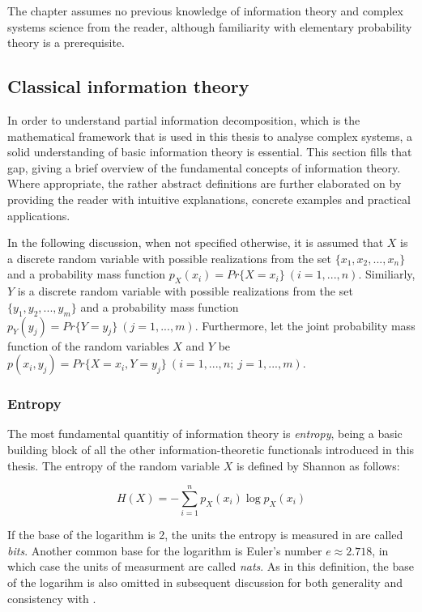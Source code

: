 \documentclass[12pt]{article}
\begin{document}
The chapter assumes no previous knowledge of information theory and complex systems science from the reader, although familiarity with elementary probability theory is a prerequisite. 

\subsection{Classical information theory}

In order to understand partial information decomposition, which is the mathematical framework that is used in this thesis to analyse complex systems, a solid understanding of basic information theory is essential. This section fills that gap, giving a brief overview of the fundamental concepts of information theory. Where appropriate, the rather abstract definitions are further elaborated on by providing the reader with intuitive explanations, concrete examples and practical applications. 

In the following discussion, when not specified otherwise, it is assumed that $X$ is a discrete random variable with possible realizations from the set $\{x_1, x_2, ..., x_n\}$ and a probability mass function $p_X(x_i) = Pr\{X = x_i\} \ (i = 1, ..., n)$. Similiarly, $Y$ is a discrete random variable with possible realizations from the set $\{y_1, y_2, ..., y_m\}$ and a probability mass function $p_Y(y_j) = Pr\{Y = y_j\} \ (j = 1, ..., m)$. Furthermore, let the joint probability mass function of the random variables $X$ and $Y$ be $p(x_i, y_j) = Pr\{X = x_i, Y = y_j\} \ (i = 1, ..., n; \ j = 1, ..., m)$. 

\subsubsection{Entropy}

The most fundamental quantitiy of information theory is \textit{entropy}, being a basic building block of all the other information-theoretic functionals introduced in this thesis. The entropy of the random variable $X$ is defined by Shannon \cite{shannon} as follows: 

\begin{equation}
H(X) = -\sum_{i=1}^{n} p_X(x_i) \log p_X(x_i)
\label{eq:entropy}
\end{equation}

If the base of the logarithm is 2, the units the entropy is measured in are called \textit{bits}. Another common base for the logarithm is Euler's number $e \approx 2.718$, in which case the units of measurment are called \textit{nats}. As in this definition, the base of the logarihm is also omitted in subsequent discussion for both generality and consistency with \cite{cover-thomas}.
\end{document}
